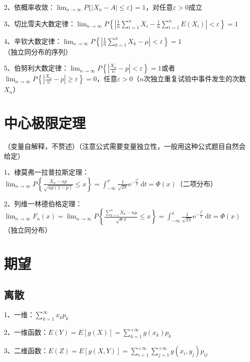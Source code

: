 2、依概率收敛：$\lim_{n \rightarrow \infty} P\{|X_n-A| \le \varepsilon \}=1$，对任意$\varepsilon > 0$成立

3、切比雪夫大数定律：$\lim_{n \rightarrow \infty} P\left\{\left|\frac{1}{n} \sum_{i=1}^{n} X_{i}-\frac{1}{n} \sum_{i=1}^{n} E\left(X_{i}\right)\right|<\varepsilon\right\}=1$

4、辛钦大数定律：$\lim_{n \rightarrow \infty} P\left\{\left|\frac{1}{n} \sum_{k=1}^{n} X_{k}-\mu\right|<\varepsilon\right\}=1$（独立同分布的序列）

5、伯努利大数定律：$\lim_{n \rightarrow \infty} P\left\{\left|\frac{X_n}{n}-p\right|<\varepsilon\right\}=1$或者$\lim_{n \rightarrow \infty} P\left\{\left|\frac{X_n}{n}-p\right| \geqslant \varepsilon\right\}=0$，任意$\varepsilon>0$（$n$次独立重复试验中事件发生的次数$X_n$）

\section{中心极限定理}

（变量自解释，不赘述）（注意公式需要变量独立性，一般用这种公式题目自然会给定）

1、棣莫弗一拉普拉斯定理：$\lim _{n \rightarrow \infty} P\left\{\frac{X_{n}-n p}{\sqrt{n p(1-p)}} \leqslant x\right\}=\int_{-\infty}^{x} \frac{1}{\sqrt{2 \pi}} \mathrm{e}^{-\frac{t^{2}}{2}} \mathrm{~d} t=\Phi(x)$（二项分布）

2、列维一林德伯格定理：$\lim_{n \rightarrow \infty} F_{n}(x)=\lim_{n \rightarrow \infty} P\left\{\frac{\sum_{k=1}^{n} X_{k}-n \mu}{\sqrt{n} \sigma} \leqslant x\right\}=\int_{-\infty}^{x} \frac{1}{\sqrt{2 \pi}} \mathrm{e}^{-\frac{t^{2}}{2}} \mathrm{~d} t=\Phi(x)$（独立同分布）

\section{期望}



\subsection{离散}

1、一维：$\sum_{k=1}^{\infty}x_kp_k$

2、一维函数：$E(Y)=E[g(X)]=\sum_{k=1}^{+\infty} g\left(x_{k}\right) p_{k}$

3、二维函数：$E(Z)=E[g(X, Y)]=\sum_{i=1}^{+\infty} \sum_{j=1}^{+\infty} g\left(x_{i}, y_{j}\right) p_{i j}$



